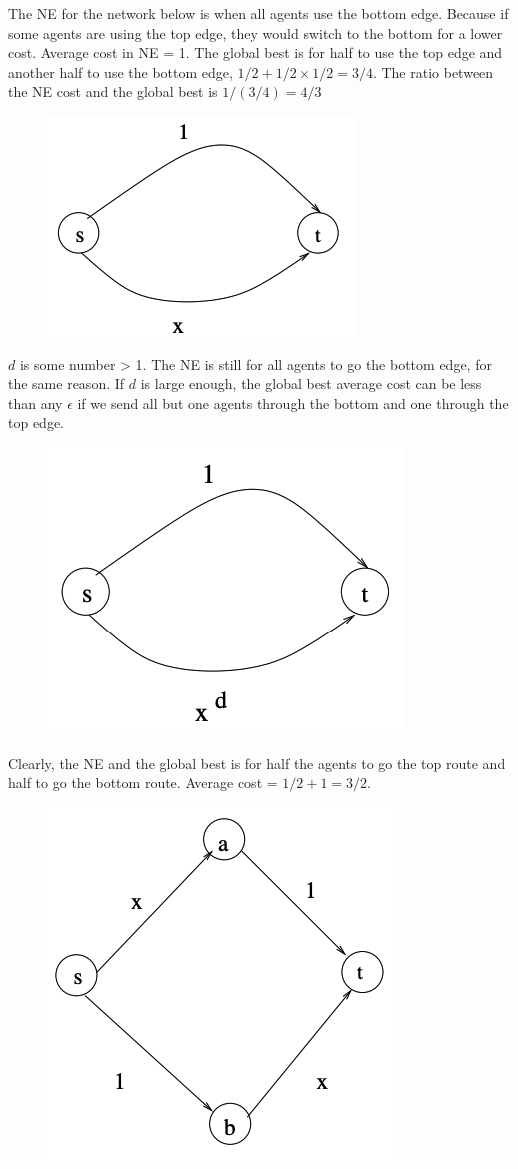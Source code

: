 \documentclass{article}
\begin{document}
The NE for the network below is when all agents use the bottom edge. Because if some agents are using the top edge, they would switch to the bottom for a lower cost. Average cost in NE = 1. The global best is for half to use the top edge and another half to use the bottom edge, $1/2 + 1/2 \times 1/2 = 3/4$. The ratio between the NE cost and the global best is $1/(3/4) = 4/3$
\begin{figure}[hbt!]
	\centering
	\includegraphics[width=.35\textwidth]{figs/flow1}
\end{figure}
\newpage
$d$ is some number > 1. The NE is still for all agents to go the bottom edge, for the same reason. If $d$ is large enough, the global best average cost can be less than any $\epsilon$ if we send all but one agents through the bottom and one through the top edge.
\begin{figure}[hbt!]
	\centering
	\includegraphics[width=.35\textwidth]{figs/flow2}
\end{figure}

Clearly, the NE and the global best is for half the agents to go the top route and half to go the bottom route. Average cost = $1/2 + 1 = 3/ 2$.
\begin{figure}[hbt!]
	\centering
	\includegraphics[width=.35\textwidth]{figs/flow3}
\end{figure}
\end{document}
